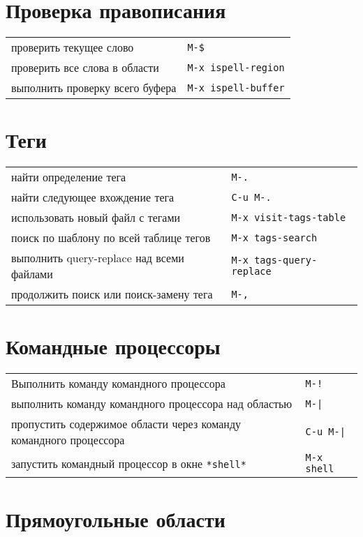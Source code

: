 \documentclass[10pt]{article}
\newlength{\ColWidth}
\newcommand{\kbd}[1]{\texttt{#1}}
\begin{document}
\section{Проверка правописания}

\begin{tabular}{p{\ColWidth}l}
проверить текущее слово & \kbd{M-\$} \\
проверить все слова в области & \kbd{M-x ispell-region} \\
выполнить проверку всего буфера & \kbd{M-x ispell-buffer} \\
\end{tabular}

\section{Теги}

\begin{tabular}{p{\ColWidth}l}
найти определение тега & \kbd{M-.} \\
найти следующее вхождение тега & \kbd{C-u M-.} \\
использовать новый файл с тегами & \kbd{M-x visit-tags-table} \\

поиск по шаблону по всей таблице тегов & \kbd{M-x tags-search} \\
выполнить query-replace над всеми файлами & \kbd{M-x tags-query-replace} \\
продолжить поиск или поиск-замену тега & \kbd{M-,} \\
\end{tabular}

\section{Командные процессоры}

\begin{tabular}{p{\ColWidth}l}
Выполнить команду командного процессора & \kbd{M-!} \\
выполнить команду командного процессора над областью & \kbd{M-|} \\
пропустить содержимое области через команду командного процессора & \kbd{C-u M-|} \\
запустить командный процессор в окне \kbd{*shell*} & \kbd{M-x shell} \\
\end{tabular}

\section{Прямоугольные области}
\end{document}
